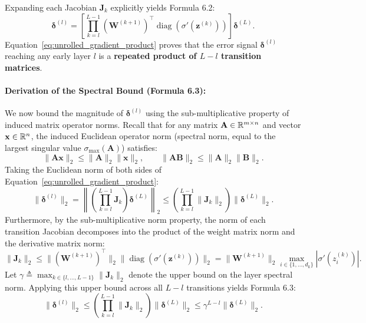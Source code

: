 Expanding each Jacobian $\mathbf{J}_k$ explicitly yields Formula 6.2:
\begin{equation}
\boldsymbol{\delta}^{(l)} = \left[ \prod_{k=l}^{L-1} (\mathbf{W}^{(k+1)})^\top \operatorname{diag}\left( \sigma'(\mathbf{z}^{(k)}) \right) \right] \boldsymbol{\delta}^{(L)}.
\label{eq:unrolled_gradient_product}
\end{equation}
Equation~\eqref{eq:unrolled_gradient_product} proves that the error signal $\boldsymbol{\delta}^{(l)}$ reaching any early layer $l$ is a \textbf{repeated product of $L-l$ transition matrices}.

\paragraph{Derivation of the Spectral Bound (Formula 6.3):}
We now bound the magnitude of $\boldsymbol{\delta}^{(l)}$ using the sub-multiplicative property of induced matrix operator norms. Recall that for any matrix $\mathbf{A} \in \mathbb{R}^{m \times n}$ and vector $\mathbf{x} \in \mathbb{R}^n$, the induced Euclidean operator norm (spectral norm, equal to the largest singular value $\sigma_{\max}(\mathbf{A})$) satisfies:
\begin{equation}
\|\mathbf{A} \mathbf{x}\|_2 \le \|\mathbf{A}\|_2 \|\mathbf{x}\|_2, \qquad \|\mathbf{A} \mathbf{B}\|_2 \le \|\mathbf{A}\|_2 \|\mathbf{B}\|_2.
\end{equation}
Taking the Euclidean norm of both sides of Equation~\eqref{eq:unrolled_gradient_product}:
\begin{equation}
\|\boldsymbol{\delta}^{(l)}\|_2 = \left\| \left( \prod_{k=l}^{L-1} \mathbf{J}_k \right) \boldsymbol{\delta}^{(L)} \right\|_2 \le \left( \prod_{k=l}^{L-1} \|\mathbf{J}_k\|_2 \right) \|\boldsymbol{\delta}^{(L)}\|_2.
\end{equation}
Furthermore, by the sub-multiplicative norm property, the norm of each transition Jacobian decomposes into the product of the weight matrix norm and the derivative matrix norm:
\begin{equation}
\|\mathbf{J}_k\|_2 \le \|(\mathbf{W}^{(k+1)})^\top\|_2 \|\operatorname{diag}\left(\sigma'(\mathbf{z}^{(k)})\right)\|_2 = \|\mathbf{W}^{(k+1)}\|_2 \max_{i \in \{1, \dots, d_k\}} \left| \sigma'(z_i^{(k)}) \right|.
\label{eq:jacobian_norm_decomposition}
\end{equation}
Let $\gamma \triangleq \max_{k \in \{l, \dots, L-1\}} \|\mathbf{J}_k\|_2$ denote the upper bound on the layer spectral norm. Applying this upper bound across all $L-l$ transitions yields Formula 6.3:
\begin{equation}
\|\boldsymbol{\delta}^{(l)}\|_2 \le \left( \prod_{k=l}^{L-1} \|\mathbf{J}_k\|_2 \right) \|\boldsymbol{\delta}^{(L)}\|_2 \le \gamma^{L-l} \|\boldsymbol{\delta}^{(L)}\|_2.
\label{eq:spectral_norm_bound}
\end{equation}

